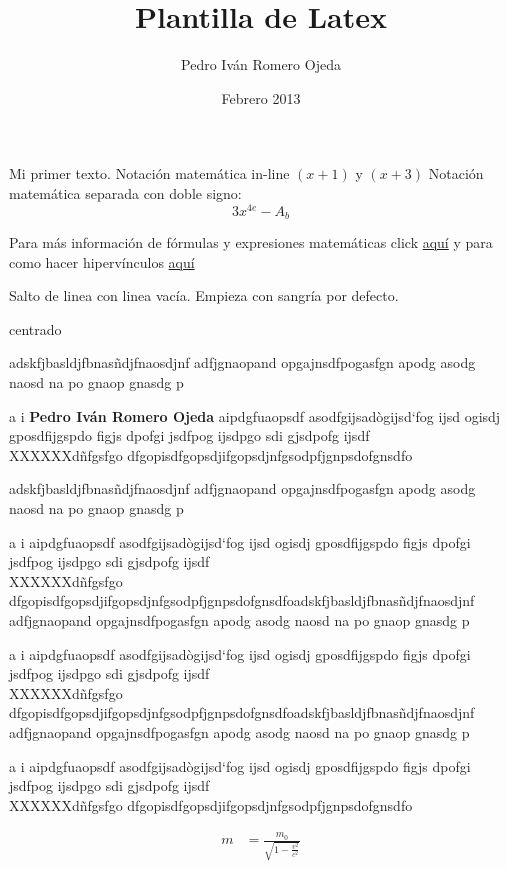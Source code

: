 \documentclass[12pt]{article}
\title{Plantilla de Latex}
\author{Pedro Iván Romero Ojeda}
\date{Febrero 2013}
\begin{document}
\maketitle
Mi primer texto. Notación matemática in-line $(x+1)$ y $(x+3)$ Notación matemática separada con doble signo: $$3x^{4e} - A_b$$

Para más información de fórmulas y expresiones matemáticas click \href{http://en.wikibooks.org/wiki/LaTeX/Mathematics}{aquí} y para como hacer hipervínculos \href{http://en.wikibooks.org/wiki/LaTeX/Hyperlinks}{aquí}

Salto de linea con linea vacía. Empieza con sangría por defecto.
\begin{center}
centrado %
\end{center}


adskfjbasldjfbnasñdjfnaosdjnf adfjgnaopand opgajnsdfpogasfgn apodg asodg naosd na po gnaop gnasdg p

a i \textbf{Pedro Iván Romero Ojeda} aipdgfuaopsdf asodfgijsadògijsd`fog ijsd ogisdj gposdfijgspdo figjs dpofgi jsdfpog ijsdpgo sdi gjsdpofg ijsdf\\
XXXXXXdñfgsfgo dfgopisdfgopsdjifgopsdjnfgsodpfjgnpsdofgnsdfo

adskfjbasldjfbnasñdjfnaosdjnf adfjgnaopand opgajnsdfpogasfgn apodg asodg naosd na po gnaop gnasdg p

a i aipdgfuaopsdf asodfgijsadògijsd`fog ijsd ogisdj gposdfijgspdo figjs dpofgi jsdfpog ijsdpgo sdi gjsdpofg ijsdf\\
XXXXXXdñfgsfgo dfgopisdfgopsdjifgopsdjnfgsodpfjgnpsdofgnsdfoadskfjbasldjfbnasñdjfnaosdjnf adfjgnaopand opgajnsdfpogasfgn apodg asodg naosd na po gnaop gnasdg p

a i aipdgfuaopsdf asodfgijsadògijsd`fog ijsd ogisdj gposdfijgspdo figjs dpofgi jsdfpog ijsdpgo sdi gjsdpofg ijsdf\\
XXXXXXdñfgsfgo dfgopisdfgopsdjifgopsdjnfgsodpfjgnpsdofgnsdfoadskfjbasldjfbnasñdjfnaosdjnf adfjgnaopand opgajnsdfpogasfgn apodg asodg naosd na po gnaop gnasdg p

a i aipdgfuaopsdf asodfgijsadògijsd`fog ijsd ogisdj gposdfijgspdo figjs dpofgi jsdfpog ijsdpgo sdi gjsdpofg ijsdf\\
XXXXXXdñfgsfgo dfgopisdfgopsdjifgopsdjnfgsodpfjgnpsdofgnsdfo

\begin{align}
m &= \frac{m_0}{\sqrt{1-\frac{v^2}{c^2}}}
\end{align}
\end{document}
